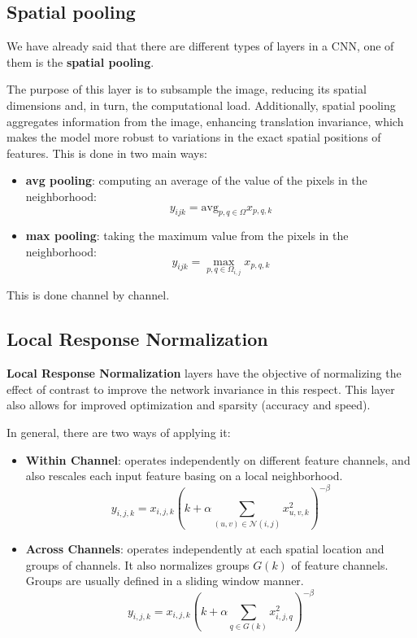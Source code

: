 \subsection{Spatial pooling}
We have already said that there are different types of layers in a CNN, one of
them is the \textbf{spatial pooling}.

The purpose of this layer is to subsample the image, reducing its spatial
dimensions and, in turn, the computational load. Additionally, spatial pooling
aggregates information from the image, enhancing translation invariance, which
makes the model more robust to variations in the exact spatial positions of
features. This is done in two main ways:
\begin{itemize}
    \item \textbf{avg pooling}: computing an average of the value of the pixels
          in the neighborhood:
          \begin{equation}
              y_{ijk} =\text{avg}_{p, q \in \Omega} x_{p, q, k}
          \end{equation}
    \item \textbf{max pooling}: taking the maximum value from the pixels in the
          neighborhood:
          \begin{equation}
              y_{ijk} = \max_{p, q \in \Omega_{i, j}} x_{p, q, k}
          \end{equation}
\end{itemize}

This is done channel by channel.
\subsection{Local Response Normalization}
\textbf{Local Response Normalization} layers have the objective of normalizing the
effect of contrast to improve the network invariance in this respect. This layer
also allows for improved optimization and sparsity (accuracy and speed).

In general, there are two ways of applying it:
\begin{itemize}
    \item \textbf{Within Channel}: operates independently on different feature
          channels, and also rescales each input feature basing on a local
          neighborhood.
          \begin{equation}
              y_{i, j, k} = x_{i, j, k} \left(k + \alpha \sum_{(u, v) \in \mathcal{N}(i, j)} x_{u, v, k}^2 \right)^{-\beta}
          \end{equation}
    \item \textbf{Across Channels}: operates independently at each spatial location
          and groups of channels. It also normalizes groups $G(k)$ of feature
          channels. Groups are usually defined in a sliding window manner.
          \begin{equation}
              y_{i, j, k} = x_{i, j, k} \left(k + \alpha \sum_{q \in G(k)} x_{i, j, q}^2 \right)^{-\beta}
          \end{equation}
\end{itemize}

